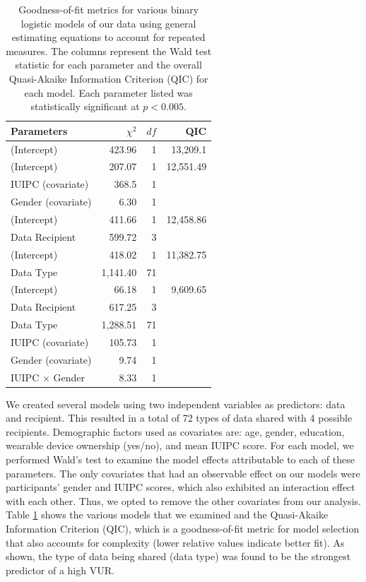 \documentclass{sig-alternate-hotpets15}
\begin{document}
\begin{table}[t]
\centering
\begin{tabular}{|l| r| r| r|}
\hline
Parameters & $\chi^2$ & $df$ & QIC\\
\hline
\hline
(Intercept) & 423.96 & 1 & 13,209.1\\
\hline
(Intercept) & 207.07 & 1 & 12,551.49\\
IUIPC (covariate) & 368.5 & 1 & \\
Gender (covariate) & 6.30 & 1 & \\
\hline
(Intercept) & 411.66 & 1 &12,458.86\\
Data Recipient & 599.72 & 3 & \\
\hline
(Intercept) & 418.02 & 1 & 11,382.75\\
Data Type & 1,141.40 & 71 & \\
\hline
(Intercept) & 66.18 & 1 & 9,609.65 \\
Data Recipient & 617.25 & 3 & \\
Data Type & 1,288.51 & 71 & \\
IUIPC (covariate) & 105.73 & 1 & \\
Gender (covariate) & 9.74 & 1 & \\
IUIPC $\times$ Gender & 8.33 & 1 &\\
\hline
\end{tabular}
\caption{Goodness-of-fit metrics for various binary logistic models of our data using general estimating equations to account for repeated measures. The columns represent the Wald test statistic for each parameter and the overall Quasi-Akaike Information Criterion (QIC) for each model. Each parameter listed was statistically significant at $p<0.005$.}
\label{regression}
\end{table}

We created several models using two independent variables as predictors: data and recipient. This resulted in a total of 72 types of data shared with 4 possible recipients. Demographic factors used as covariates are: age, gender, education, wearable device ownership (yes/no), and mean IUIPC score. For each model, we performed Wald's test to examine the model effects attributable to each of these parameters. The only covariates that had an observable effect on our models were participants' gender and IUIPC scores, which also exhibited an interaction effect with each other. Thus, we opted to remove the other covariates from our analysis. Table \ref{regression} shows the various models that we examined and the Quasi-Akaike Information Criterion (QIC), which is a goodness-of-fit metric for model selection that also accounts for complexity (lower relative values indicate better fit). As shown, the type of data being shared (data type) was found to be the strongest predictor of a high VUR.
\end{document}
